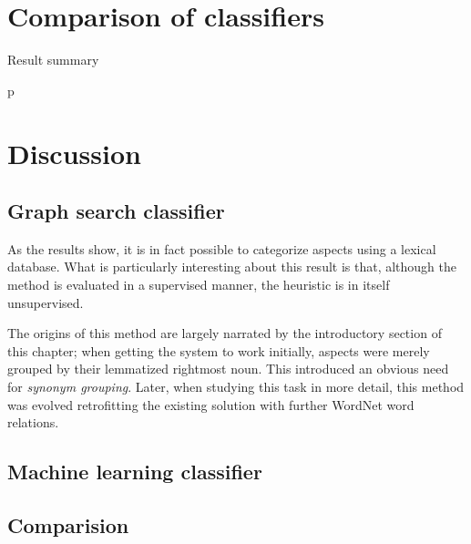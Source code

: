 \documentclass[a4paper,11pt]{kth-mag}
\begin{document}

\section{Comparison of classifiers}
\label{sec:comparison}

\begin{table}[h]
  \centering

  \vspace{0.4cm}\caption{Result summary}
  \label{general_asp}
p\end{table}


\section{Discussion}
\subsection{Graph search classifier}
As the results show, it is in fact possible to categorize aspects using a lexical database.
What is particularly interesting about this result is that, although the method is evaluated in a supervised
manner, the heuristic is in itself unsupervised. %


The origins of this method are largely narrated by the introductory section of this chapter;
when getting the system to work initially, aspects were merely grouped by their lemmatized rightmost noun.
This introduced an obvious need for \emph{synonym grouping}. Later, when studying this task in more detail,
this method was evolved retrofitting the existing solution with further WordNet word relations.

\subsection{Machine learning classifier}

\subsection{Comparision}
\end{document}
